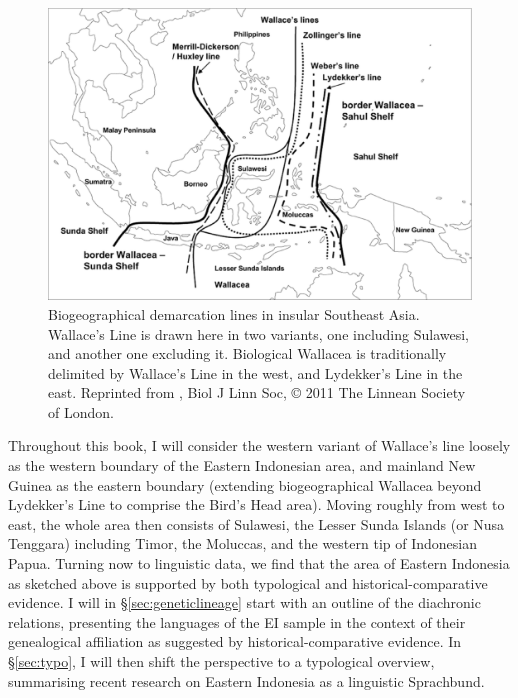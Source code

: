 \begin{figure}

\includegraphics[width=1.0\textwidth]{figures/Wallacea2.eps}
\caption[Biogeographical demarcation lines in insular Southeast Asia]{Biogeographical demarcation lines in insular Southeast Asia. Wallace's Line is drawn here in two variants, one including Sulawesi, and another one excluding it. Biological Wallacea is traditionally delimited by Wallace's Line in the west, and Lydekker's Line in the east. Reprinted from \citealt{Welzen2011}, Biol J Linn Soc, © 2011 The Linnean Society of London.}\label{map:wallacea}

\end{figure}

Throughout this book, I will consider the western variant of Wallace's line loosely as the western boundary of the Eastern Indonesian area, and mainland New Guinea as the eastern boundary (extending biogeographical Wallacea beyond Lydekker's Line to comprise the Bird's Head area). Moving roughly from west to east, the whole area then consists of Sulawesi, the Lesser Sunda Islands (or Nusa Tenggara) including Timor, the Moluccas, and the western tip of Indonesian Papua. Turning now to linguistic data, we find that the area of Eastern Indonesia as sketched above is supported by both typological and historical-comparative evidence. I will in §\ref{sec:geneticlineage} start with an outline of the diachronic relations, presenting the languages of the EI sample in the context of their genealogical affiliation as suggested by historical-comparative evidence. In §\ref{sec:typo}, I will then shift the perspective to a typological overview, summarising recent research on Eastern Indonesia as a linguistic Sprachbund. 

